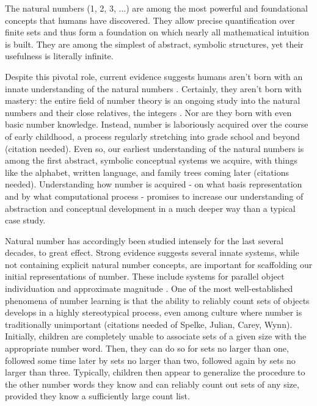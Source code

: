 \documentclass[10pt,letterpaper]{article}
\begin{document}
The natural numbers (1, 2, 3, $\ldots$) are among the most powerful
and foundational concepts that humans have discovered. They allow
precise quantification over finite sets and thus form a foundation on
which nearly all mathematical intuition is built. They are among the
simplest of abstract, symbolic structures, yet their usefulness is
literally infinite.

Despite this pivotal role, current evidence suggests humans aren't
born with an innate understanding of the natural numbers
\citep{Car2009}. Certainly, they aren't born with mastery: the entire
field of number theory is an ongoing study into the natural numbers
and their close relatives, the integers
\citep{ireland1982classical}. Nor are they born with even basic number
knowledge. Instead, number is laboriously acquired over the course of
early childhood, a process regularly stretching into grade school and
beyond (citation needed). Even so, our earliest understanding of the
natural numbers is among the first abstract, symbolic conceptual
systems we acquire, with things like the alphabet, written language,
and family trees coming later (citations needed). Understanding how
number is acquired - on what basis representation and by what
computational process - promises to increase our understanding of
abstraction and conceptual development in a much deeper way than a
typical case study.

Natural number has accordingly been studied intensely for the last
several decades, to great effect. Strong evidence suggests several
innate systems, while not containing explicit natural number concepts,
are important for scaffolding our initial representations of
number. These include systems for parallel object individuation and
approximate magnitude \citep{feigenson2004core}. One of the most
well-established phenomena of number learning is that the ability to
reliably count sets of objects develops in a highly stereotypical
process, even among culture where number is traditionally unimportant
(citations needed of Spelke, Julian, Carey, Wynn). Initially, children
are completely unable to associate sets of a given size with the
appropriate number word. Then, they can do so for sets no larger than
one, followed some time later by sets no larger than two, followed
again by sets no larger than three. Typically, children then appear to
generalize the procedure to the other number words they know and can
reliably count out sets of any size, provided they know a sufficiently
large count list.
\end{document}
